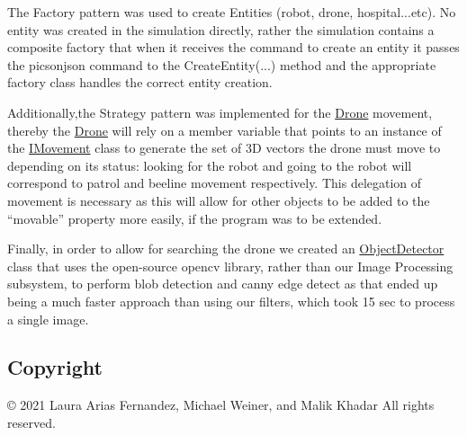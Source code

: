 The Factory pattern was used to create Entities (robot, drone, hospital...etc). No entity was created in the simulation directly, rather the simulation contains a composite factory that when it receives the command to create an entity it passes the {\ttfamily picsonjson} command to the {\ttfamily Create\+Entity(...)} method and the appropriate factory class handles the correct entity creation.



Additionally,the Strategy pattern was implemented for the \hyperlink{classDrone}{Drone} movement, thereby the \hyperlink{classDrone}{Drone} will rely on a member variable that points to an instance of the \hyperlink{classIMovement}{I\+Movement} class to generate the set of 3D vectors the drone must move to depending on its status\+: looking for the robot and going to the robot will correspond to patrol and beeline movement respectively. This delegation of movement is necessary as this will allow for other objects to be added to the “movable” property more easily, if the program was to be extended.



Finally, in order to allow for searching the drone we created an \hyperlink{classObjectDetector}{Object\+Detector} class that uses the open-\/source {\ttfamily opencv} library, rather than our Image Processing subsystem, to perform blob detection and canny edge detect as that ended up being a much faster approach than using our filters, which took 15 sec to process a single image.



\subsection*{Copyright}

\copyright{} 2021 Laura Arias Fernandez, Michael Weiner, and Malik Khadar All rights reserved. 